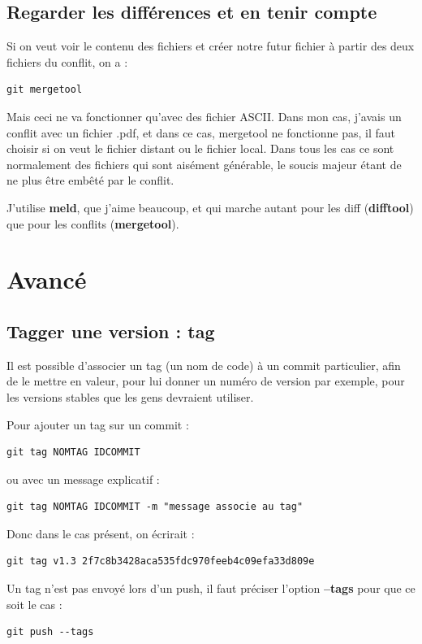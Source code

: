 \documentclass[a4paper,twoside]{article}
\begin{document}
\subsection{Regarder les différences et en tenir compte}
Si on veut voir le contenu des fichiers et créer notre futur fichier à partir des deux fichiers du conflit, on a :
\begin{verbatim}
git mergetool
\end{verbatim}

Mais ceci ne va fonctionner qu'avec des fichier ASCII. Dans mon cas, j'avais un conflit avec un fichier .pdf, et dans ce cas, mergetool ne fonctionne pas, il faut choisir si on veut le fichier distant ou le fichier local. Dans tous les cas ce sont normalement des fichiers qui sont aisément générable, le soucis majeur étant de ne plus être embêté par le conflit.

\begin{remarque}
J'utilise \textbf{meld}, que j'aime beaucoup, et qui marche autant pour les diff (\textbf{difftool}) que pour les conflits (\textbf{mergetool}).
\end{remarque}

\section{Avancé}
\subsection{Tagger une version : tag}
Il est possible d'associer un tag (un nom de code) à un commit particulier, afin de le mettre en valeur, pour lui donner un numéro de version par exemple, pour les versions stables que les gens devraient utiliser.

Pour ajouter un tag sur un commit :
\begin{verbatim}
git tag NOMTAG IDCOMMIT
\end{verbatim}
ou avec un message explicatif :
\begin{verbatim}
git tag NOMTAG IDCOMMIT -m "message associe au tag"
\end{verbatim}


Donc dans le cas présent, on écrirait :
\begin{verbatim}
git tag v1.3 2f7c8b3428aca535fdc970feeb4c09efa33d809e
\end{verbatim}

Un tag n'est pas envoyé lors d'un push, il faut préciser l'option \textbf{--tags} pour que ce soit le cas :
\begin{verbatim}
git push --tags
\end{verbatim}
\end{document}
